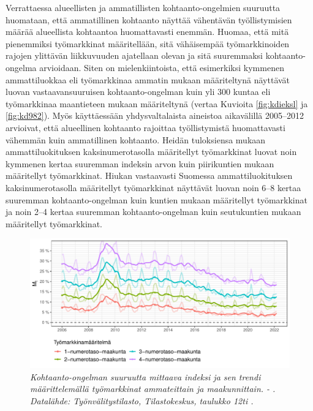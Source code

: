 \documentclass[12pt]{article}
\newcommand{\lastdatamonth}{\unskip}
\newcommand{\firstdatamonth}{\unskip}
\newcommand{\newcaption}[1]{\caption{\textit{\footnotesize{#1}}}}
\begin{document}
Verrattaessa alueellisten ja ammatillisten kohtaanto-ongelmien suuruutta huomataan, että ammatillinen kohtaanto näyttää vähentävän työllistymisien määrää alueellista kohtaantoa huomattavasti enemmän. Huomaa, että mitä pienemmiksi työmarkkinat määritellään, sitä vähäisempää työmarkkinoiden rajojen ylittävän liikkuvuuden ajatellaan olevan ja sitä suuremmaksi kohtaanto-ongelma arvioidaan. Siten on mielenkiintoista, että esimerkiksi kymmenen ammattiluokkaa eli työmarkkinaa ammatin mukaan määriteltynä näyttävät luovan vastaavansuuruisen kohtaanto-ongelman kuin yli 300 kuntaa eli työmarkkinaa maantieteen mukaan määriteltynä (vertaa Kuvioita \ref{fig:kdieksl} ja \ref{fig:kd982}). Myös  käyttäessään yhdysvaltalaista aineistoa aikavälillä 2005–2012 arvioivat, että alueellinen kohtaanto rajoittaa työllistymistä huomattavasti vähemmän kuin ammatillinen kohtaanto. Heidän tuloksiensa mukaan ammattiluokituksen kaksinumerotasolla määritellyt työmarkkinat luovat noin kymmenen kertaa suuremman indeksin arvon kuin piirikuntien mukaan määritellyt työmarkkinat. Hiukan vastaavasti Suomessa ammattiluokituksen kaksinumerotasolla määritellyt työmarkkinat näyttävät luovan noin 6–8 kertaa suuremman kohtaanto-ongelman kuin kuntien mukaan määritellyt työmarkkinat ja noin 2–4 kertaa suuremman kohtaanto-ongelman kuin seutukuntien mukaan määritellyt työmarkkinat. 

\begin{figure}
\centering
\includegraphics[scale = 0.8]{../kuviot/indeksi_ammateittain_maakunnittain.pdf}
    \newcaption{Kohtaanto-ongelman suuruutta mittaava indeksi ja sen trendi määrittelemällä työmarkkinat ammateittain ja maakunnittain. \protect \firstdatamonth \phantom{}  - \protect\lastdatamonth. Datalähde: Työnvälitystilasto, Tilastokeskus, taulukko 12ti \protect \cite{svt2011}.}
   \label{fig:l0184hg}
\end{figure}
\end{document}
